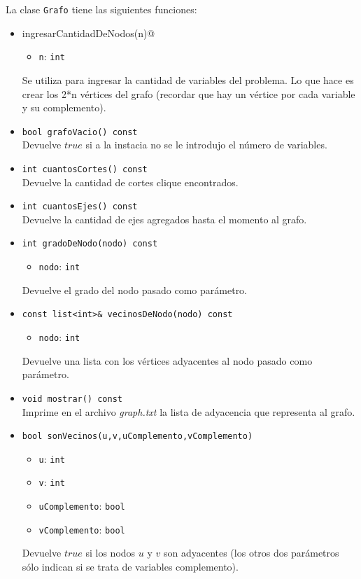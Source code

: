 La clase \verb_Grafo_ tiene las siguientes funciones:

\begin{itemize}
\item \verb@void ingresarCantidadDeNodos(n)@ 
	\begin{itemize}
	\item \verb_n_: \verb_int_
	\end{itemize}
Se utiliza para ingresar la cantidad de variables del problema. Lo que hace es crear los 2*n v\'ertices del grafo (recordar que hay un v\'ertice por cada variable y su complemento).

\item \verb_bool grafoVacio() const_\\
Devuelve $true$ si a la instacia no se le introdujo el n\'umero de variables.

\item \verb_int cuantosCortes() const_\\
Devuelve la cantidad de cortes clique encontrados.

\item \verb_int cuantosEjes() const_\\
Devuelve la cantidad de ejes agregados hasta el momento al grafo.

\item \verb_int gradoDeNodo(nodo) const_
	\begin{itemize}
	\item \verb_nodo_: \verb_int_
	\end{itemize}
Devuelve el grado del nodo pasado como par\'ametro.

\item \verb_const list<int>& vecinosDeNodo(nodo) const_
	\begin{itemize}
	\item \verb_nodo_: \verb_int_
	\end{itemize}
Devuelve una lista con los v\'ertices adyacentes al nodo pasado como par\'ametro.

\item \verb_void mostrar() const_\\
Imprime en el archivo \textit{graph.txt} la lista de adyacencia que representa al grafo.

\item \verb_bool sonVecinos(u,v,uComplemento,vComplemento)_
	\begin{itemize}
	\item \verb_u_: \verb_int_
	\item \verb_v_: \verb_int_
	\item \verb_uComplemento_: \verb_bool_
	\item \verb_vComplemento_: \verb_bool_
	\end{itemize}
Devuelve $true$ si los nodos $u$ y $v$ son adyacentes (los otros dos par\'ametros s\'olo indican si se trata de variables complemento).


\end{itemize}

